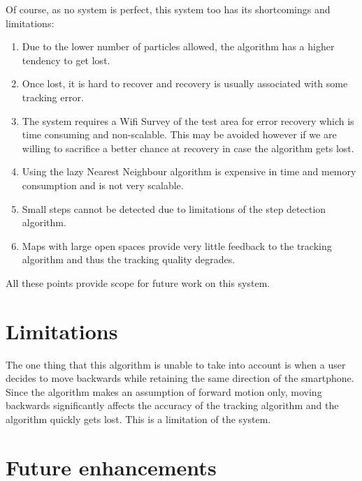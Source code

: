 Of course, as no system is perfect, this system too has its shortcomings and limitations: 

\begin{enumerate}
\item Due to the lower number of particles allowed, the algorithm has a higher tendency to get lost.
\item Once lost, it is hard to recover and recovery is usually associated with some tracking error.
\item The system requires a Wifi Survey of the test area for error recovery which is time consuming and non-scalable. This may be avoided however if we are willing to sacrifice a better chance at recovery in case the algorithm gets lost.
\item Using the lazy Nearest Neighbour algorithm is expensive in time and memory consumption and is not very scalable.
\item Small steps cannot be detected due to limitations of the step detection algorithm.
\item Maps with large open spaces provide very little feedback to the tracking algorithm and thus the tracking quality degrades.
\end{enumerate}

All these points provide scope for future work on this system.



\section{Limitations}

The one thing that this algorithm is unable to take into account is when a user decides to move backwards
while retaining the same direction of the smartphone. 
Since the algorithm makes an assumption of forward motion only, moving backwards significantly affects the accuracy of the tracking algorithm and the algorithm quickly gets lost. This is a limitation of the system.


\section{Future enhancements}

